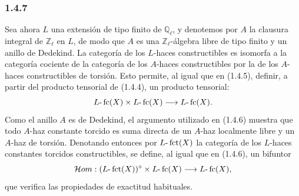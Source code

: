 \subsubsection*{1.4.7}
Sea ahora \(L\) una extensión de tipo finito de \(\mathbb Q_\ell\), y denotemos por \(A\) la clausura integral de \(\mathbb Z_\ell\) en \(L\), de modo que \(A\) es una \(\mathbb Z_\ell\)-álgebra libre de tipo finito y un anillo de Dedekind. La categoría de los \(L\)-haces constructibles es isomorfa a la categoría cociente de la categoría de los \(A\)-haces constructibles por la de los \(A\)-haces constructibles de torsión. Esto permite, al igual que en (1.4.5), definir, a partir del producto tensorial de (1.4.4), un producto tensorial:
\[
L\text{-}\operatorname{fc}(X)\times L\text{-}\operatorname{fc}(X)\longrightarrow L\text{-}\operatorname{fc}(X).
\]
Como el anillo \(A\) es de Dedekind, el argumento utilizado en (1.4.6) muestra que todo \(A\)-haz constante torcido es suma directa de un \(A\)-haz localmente libre y un \(A\)-haz de torsión. Denotando entonces por \(L\text{-}\operatorname{fct}(X)\) la categoría de los \(L\)-haces constantes torcidos constructibles, se define, al igual que en (1.4.6), un bifuntor
\[
\mathcal{H}om:(L\text{-}\operatorname{fct}(X))^\circ\times L\text{-}\operatorname{fc}(X)
\longrightarrow L\text{-}\operatorname{fc}(X),
\]
que verifica las propiedades de exactitud habituales.

